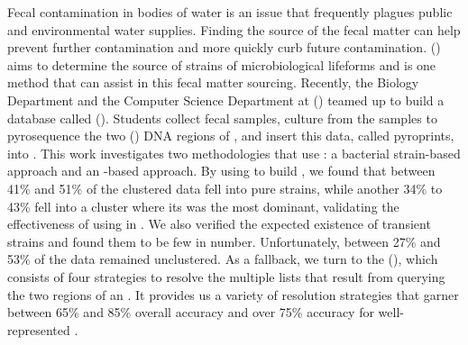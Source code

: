 Fecal contamination in bodies of water is an issue that frequently plagues public and environmental water supplies.
Finding the source of the fecal matter can help prevent further contamination and more quickly curb future contamination.
\MSTlong{} (\mst{}) aims to determine the source \spec{} of strains of microbiological lifeforms and \libdep{} \mst{} is one method that can assist in this fecal matter sourcing.
Recently, the Biology Department and the Computer Science Department at \cplong{} (\cp{}) teamed up to build a database called \cploplong{} (\cplop{}).
Students collect fecal samples, culture \ecoli{} \isols{} from the samples to pyrosequence the two \itslong{} (\itsshort{}) DNA regions of \ecoli{}, and insert this data, called pyroprints, into \cplop{}.
This work investigates two \mst{} methodologies that use \cplop{}: a bacterial strain-based approach and an \isol{}-based approach.
By using \dbscan{} to build \bslongs{}, we found that between 41\% and 51\% of the clustered data fell into pure strains, while another 34\% to 43\% fell into a cluster where its \spec{} was the most dominant, validating the effectiveness of using \ecoli{} in \cplop{}.
We also verified the expected existence of transient strains and found them to be few in number.
Unfortunately, between 27\% and 53\% of the data remained unclustered.
As a fallback, we turn to the \kraplong{} (\krap{}), which consists of four strategies to resolve the multiple \knnlong{} lists that result from querying the two \itsshort{} regions of an \ecoli{} \isol{}.
It provides us a variety of resolution strategies that garner between 65\% and 85\% overall accuracy and over 75\% accuracy for well-represented \spec{}.
